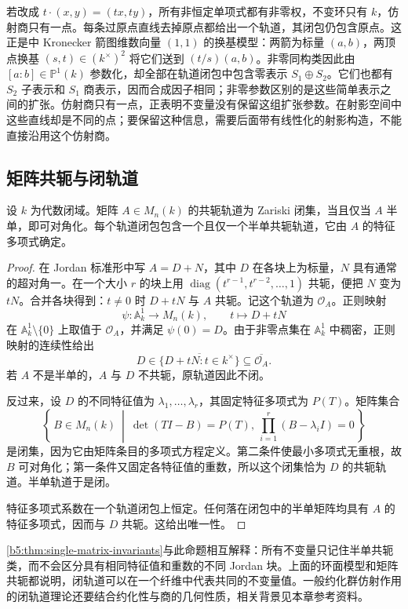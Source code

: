 \ProseParagraphBreak
若改成 \(t\cdot(x,y)=(tx,ty)\)，所有非恒定单项式都有非零权，不变环只有 \(k\)，仿射商只有一点。每条过原点直线去掉原点都给出一个轨道，其闭包仍包含原点。这正是中 Kronecker 箭图维数向量 \((1,1)\) 的换基模型：两箭为标量 \((a,b)\)，两顶点换基 \((s,t)\in(k^\times)^2\) 将它们送到 \((t/s)(a,b)\)。非零同构类因此由 \([a:b]\in\mathbb P^1(k)\) 参数化，却全部在轨道闭包中包含零表示 \(S_1\oplus S_2\)。它们也都有 \(S_2\) 子表示和 \(S_1\) 商表示，因而合成因子相同；非零参数区别的是这些简单表示之间的扩张。仿射商只有一点，正表明不变量没有保留这组扩张参数。在射影空间中这些直线却是不同的点；要保留这种信息，需要后面带有线性化的射影构造，不能直接沿用这个仿射商。

\subsection{矩阵共轭与闭轨道}
\label{b5:subsec:2206:04}

\begin{proposition}\label{b5:prop:matrix-closed-orbits}
	设 \(k\) 为代数闭域。矩阵 \(A\in M_n(k)\) 的共轭轨道为 Zariski 闭集，当且仅当 \(A\) 半单，即可对角化。每个轨道闭包包含一个且仅一个半单共轭轨道，它由 \(A\) 的特征多项式确定。
\end{proposition}
\begin{proof}
	在 Jordan 标准形中写 \(A=D+N\)，其中 \(D\) 在各块上为标量，\(N\) 具有通常的超对角一。在一个大小 \(r\) 的块上用 \(\operatorname{diag}(t^{r-1},t^{r-2},\ldots,1)\) 共轭，便把 \(N\) 变为 \(tN\)。合并各块得到：\(t\ne0\) 时 \(D+tN\) 与 \(A\) 共轭。记这个轨道为 \(\mathcal O_A\)。正则映射
	\[
		\psi:\mathbb A^1_k\longrightarrow M_n(k),\qquad t\longmapsto D+tN
	\]
	在 \(\mathbb A^1_k\setminus\{0\}\) 上取值于 \(\mathcal O_A\)，并满足 \(\psi(0)=D\)。由于非零点集在 \(\mathbb A^1_k\) 中稠密，正则映射的连续性给出
	\[
		D\in\overline{\{D+tN:t\in k^\times\}} \subseteq\overline{\mathcal O_A}.
	\]
	若 \(A\) 不是半单的，\(A\) 与 \(D\) 不共轭，原轨道因此不闭。

	反过来，设 \(D\) 的不同特征值为 \(\lambda_1,\ldots,\lambda_r\)，其固定特征多项式为 \(P(T)\)。矩阵集合
	\[
		\left\{\,B\in M_n(k)\ \middle|\
		\det(TI-B)=P(T),\
		\prod_{i=1}^r(B-\lambda_iI)=0\,\right\}
	\]
	是闭集，因为它由矩阵条目的多项式方程定义。第二条件使最小多项式无重根，故 \(B\) 可对角化；第一条件又固定各特征值的重数，所以这个闭集恰为 \(D\) 的共轭轨道。半单轨道于是闭。

	特征多项式系数在一个轨道闭包上恒定。任何落在闭包中的半单矩阵均具有 \(A\) 的特征多项式，因而与 \(D\) 共轭。这给出唯一性。
\end{proof}

\cref{b5:thm:single-matrix-invariants}与此命题相互解释：所有不变量只记住半单共轭类，而不会区分具有相同特征值和重数的不同 Jordan 块。上面的环面模型和矩阵共轭都说明，闭轨道可以在一个纤维中代表共同的不变量值。一般约化群仿射作用的闭轨道理论还要结合约化性与商的几何性质，相关背景见本章参考资料。
